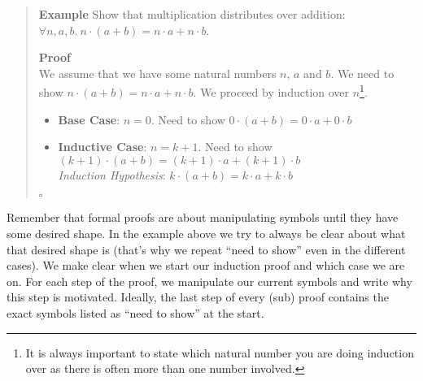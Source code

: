 \documentclass{tufte-handout}
\newcounter{example}
\newenvironment{example}
{\refstepcounter{example}\begin{quote}
\textbf{Example \arabic{example}}}
{

$\square$\end{quote}}
\begin{document}
\begin{example}\label{ex:distr}
  Show that multiplication distributes over addition:
  $\forall n,a,b.~n\cdot(a+b) = n\cdot a + n\cdot b$.

  \textbf{Proof}\\
  We assume that we have some natural numbers $n$, $a$ and $b$.
  We need to show $n\cdot(a+b) = n\cdot a + n\cdot b$.
  We proceed by induction over $n$\footnote{It is always important
    to state which natural number you are doing induction over as
    there is often more than one number involved. }.
  \begin{itemize}
  \item \textbf{Base Case}: $n = 0$. Need to show $0 \cdot (a + b) = 0 \cdot a + 0 \cdot b$
  \item \textbf{Inductive Case}: $n = k + 1$. Need to show
    $(k + 1) \cdot (a + b) = (k + 1) \cdot a + (k + 1) \cdot b$\\
    \textit{Induction Hypothesis}: $k \cdot (a + b) = k \cdot a + k \cdot b$
  \end{itemize}
\end{example}

Remember that formal proofs are about manipulating symbols until
they have some desired shape. In the example above we try to
always be clear about what that desired shape is (that's why we
repeat ``need to show'' even in the different cases). We make
clear when we start our induction proof and which case we are on.
For each step of the proof, we manipulate our current symbols and
write why this step is motivated. Ideally, the last step of every
(sub) proof contains the exact symbols listed as ``need to show''
at the start.
\end{document}
